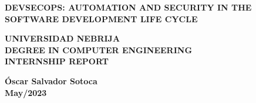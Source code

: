 \documentclass[11pt]{article}
\begin{document}
	\begin{titlepage}
		{\color{white}{.}}
		\linebreak
		\linebreak
		
		\centering
		\linebreak
		\vspace{3cm}
		
		{\LARGE\textbf{\color{RojoNebrija}DEVSECOPS: AUTOMATION AND SECURITY IN THE SOFTWARE DEVELOPMENT LIFE CYCLE}\par}
		\vspace{2cm}
		
		{\Large \textbf{\color{black}UNIVERSIDAD NEBRIJA \\ DEGREE IN COMPUTER ENGINEERING \\ INTERNSHIP REPORT}\par}
		\vspace{2cm}
		

		{\Large \textbf{ Óscar Salvador Sotoca\\ May/2023}\par}
		\vspace{2cm}

	\end{titlepage}
\end{document}
